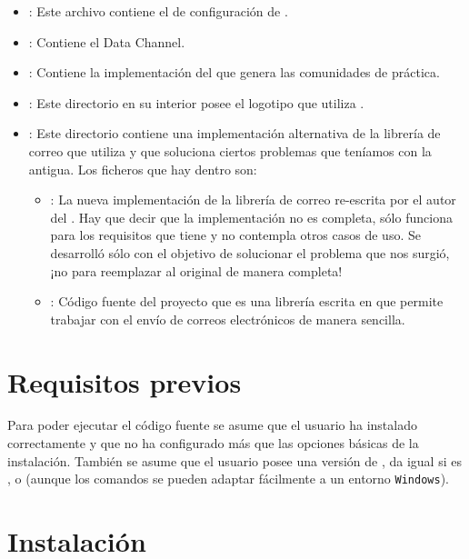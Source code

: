 \begin{itemize}
\item {}: Este archivo contiene el \profile{} de configuración de \alma{}.
\item {}: Contiene el Data Channel.
\item {}: Contiene la implementación del \profile{} que genera las comunidades de práctica.
\item {}: Este directorio en su interior posee el logotipo que utiliza \alma{}.
\item {}: Este directorio contiene una implementación alternativa de la librería de correo que utiliza \tiki{} y que soluciona ciertos problemas que teníamos con la antigua. Los ficheros que hay dentro son:

	\begin{itemize}
	\item {}: La nueva implementación de la librería de correo re-escrita por el autor del \pfc{}. Hay que decir que la implementación no es completa, sólo funciona para los requisitos que tiene \alma{} y no contempla otros casos de uso. Se desarrolló sólo con el objetivo de solucionar el problema que nos surgió, ¡no para reemplazar al original de manera completa!
	\item {}: Código fuente del proyecto  \cite{web:swiftmailer} que es una librería escrita en \php{} que permite trabajar con el envío de correos electrónicos de manera sencilla.
	\end{itemize}
\end{itemize}

\section{Requisitos previos}

Para poder ejecutar el código fuente se asume que el usuario ha instalado correctamente \tiki{} y que no ha configurado más que las opciones básicas de la instalación. También se asume que el usuario posee una versión de , da igual si es ,  o  (aunque los comandos se pueden adaptar fácilmente a un entorno \texttt{Windows}).

\section{Instalación}

